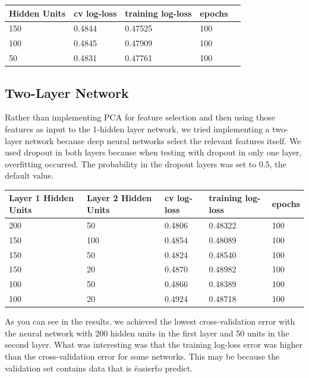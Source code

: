 \documentclass[twoside,11pt]{article}
\theoremstyle{definition}
\begin{document}
      \begin{center}
          \begin{tabular}{ | l | l | l | l | p{5cm} |}
          \hline
          Hidden Units & cv log-loss & training log-loss & epochs \\ \hline
          150 & 0.4844 & 0.47525 & 100 \\ \hline
          100 & 0.4845 & 0.47909 & 100 \\ \hline
          50 & 0.4831 & 0.47761 & 100 \\ \hline 
          \end{tabular}
      \end{center}

\subsection{Two-Layer Network}
Rather than implementing PCA for feature selection and then using those features as input to the 1-hidden layer network, we tried implementing a two-layer network because deep neural networks select the relevant features itself. We used dropout in both layers because when testing with dropout in only one layer, overfitting occurred. The probability in the dropout layers was set to 0.5, the default value. 

      \begin{center}
          \begin{tabular}{ | l | l | l | l | p{5cm} |}
          \hline
          Layer 1 Hidden Units & Layer 2 Hidden Units & cv log-loss & training log-loss & epochs \\ \hline
          200 & 50 & 0.4806 & 0.48322 & 100 \\ \hline
          150 & 100 & 0.4854 & 0.48089 & 100 \\ \hline
          150 & 50 & 0.4824 & 0.48540 & 100 \\ \hline
          150 & 20 & 0.4870 & 0.48982 & 100 \\ \hline
          100 & 50 & 0.4866 & 0.48389 & 100 \\ \hline
          100 & 20 & 0.4924 & 0.48718 & 100 \\ \hline
          \end{tabular}
      \end{center}

As you can see in the results, we achieved the lowest cross-validation error with the neural network with 200 hidden units in the first layer and 50 units in the second layer. What was interesting was that the training log-loss error was higher than the cross-validation error for some networks. This may be because the validation set contains data that is \"easier\" to predict. 
\end{document}
